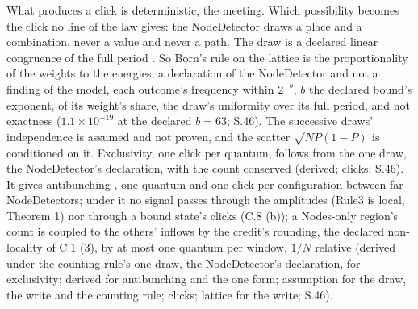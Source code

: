 \documentclass[pdflatex,sn-mathphys-num]{sn-jnl}
\theoremstyle{thmstyleone}
\theoremstyle{thmstyletwo}
\begin{document}
What produces a click is deterministic, the meeting. Which possibility becomes the click no line of the law gives: the NodeDetector draws a place and a combination, never a value and never a path. The draw is a declared linear congruence of the full period \cite{hull_dobell}. So Born's rule on the lattice \cite{born} is the proportionality of the weights to the energies, a declaration of the NodeDetector and not a finding of the model, each outcome's frequency within $2^{-b}$, $b$ the declared bound's exponent, of its weight's share, the draw's uniformity over its full period, and not exactness ($1.1 \times 10^{-19}$ at the declared $b = 63$; S.46). The successive draws' independence is assumed and not proven, and the scatter $\sqrt{NP(1 - P)}$ is conditioned on it. Exclusivity, one click per quantum, follows from the one draw, the NodeDetector's declaration, with the count conserved (derived; clicks; S.46). It gives antibunching \cite{grangier}, one quantum and one click per configuration between far NodeDetectors; under it no signal passes through the amplitudes (Rule3 is local, Theorem 1) nor through a bound state's clicks (C.8 (b)); a Nodes-only region's count is coupled to the others' inflows by the credit's rounding, the declared non-locality of C.1 (3), by at most one quantum per window, $1 / N$ relative (derived under the counting rule's one draw, the NodeDetector's declaration, for exclusivity; derived for antibunching and the one form; assumption for the draw, the write and the counting rule; clicks; lattice for the write; S.46).
\end{document}
